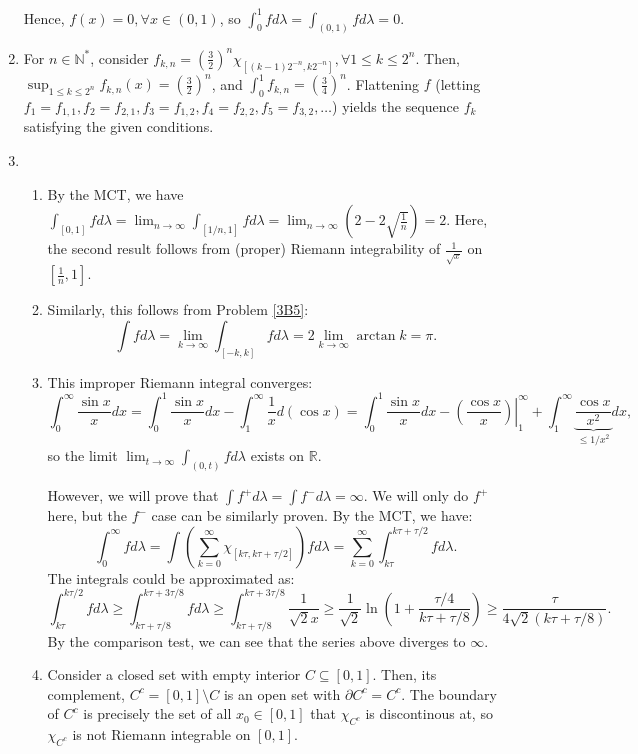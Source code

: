 \begin{enumerate}[label=\textbf{3B.\arabic*}]
  Hence, \( f(x) = 0, \forall  x \in (0, 1) \), so \( \int _{0}^{1} fd\lambda =
  \int _{(0, 1)} fd\lambda = 0 \). 
\item For \( n \in \mathbb{N}^{*} \), consider \( f_{k,n} = \left( \frac{3}{2}
  \right) ^{n} \chi_{[(k-1)2^{-n}, k 2^{-n}]}, \forall 1 \le k \le 2^{n} \).
  Then, \( \sup _{1 \le k \le 2^{n}} f_{k,n}(x) = \left( \frac{3}{2} \right)^{n}
  \), and \( \int _{0}^{1} f_{k,n} = \left( \frac{3}{4} \right) ^{n} \).
  Flattening \( f \) (letting \( f_{1} = f_{1,1}, f_{2} = f_{2,1}, f_{3} =
  f_{1,2}, f_{4} = f_{2,2}, f_{5} = f_{3,2}, \ldots  \)) yields the sequence \(
  f_{k}\) satisfying the given conditions.
\item \begin{enumerate}[label=(\alph*)]
    \item
  By the MCT, we have \( \int_{[0, 1]} fd\lambda = \lim_{n \to \infty} \int
  _{[1 /n, 1]} fd\lambda = \lim_{n \to \infty}\left( 2 - 2\sqrt{\frac{1}{n}}
  \right)  = 2  \). Here, the second result follows from (proper) Riemann
  integrability of \( \frac{1}{\sqrt{x} } \) on \(  \left[ \frac{1}{n}, 1
  \right]  \).
\item Similarly, this follows from Problem \ref{3B5}:
  \[
    \int fd\lambda = \lim_{ k \to \infty} \int _{[-k, k]}fd\lambda = 2 \lim_{ k
    \to \infty}  \arctan k = \pi
  .\]
\item This improper Riemann integral converges:
  \[
    \int _{0}^{\infty} \frac{\sin x}{x}dx = \int _{0}^{1} \frac{\sin x}{x}dx -\int
    _{1}^{\infty} \frac{1}{x} d(\cos x) = \int _{0}^{1} \frac{\sin x}{x}dx -
    \left.\left( \frac{\cos x}{x} \right)\right|_{1}^{\infty} + \int _{1}^{\infty}
    \underbrace{\frac{\cos x}{x^2}}_{\le 1 /x^2}dx
  ,\] so the limit \( \lim_{t \to \infty} \int _{(0, t)} fd\lambda \) exists on
  \( \mathbb{R} \).

  However, we will prove that \( \int f^{+}d\lambda = \int f^{-}d\lambda =
  \infty \). We will only do \( f^{+} \) here, but the \( f^{-} \) case can be
  similarly proven. By the MCT, we have:
  \[
    \int _{0}^{\infty} fd\lambda = \int \left( \sum_{k =
    0}^{\infty} \chi_{[k\tau, k\tau + \tau /2]} \right)  f d\lambda = \sum_{k =
  0}^{\infty} \int_{k\tau }^{k\tau  + \tau /2} fd\lambda
  .\] 
  The integrals could be approximated as:
  \[
    \int _{k\tau }^{k\tau /2} fd\lambda \ge 
    \int _{k\tau + \tau /8}^{k\tau +3\tau /8} fd\lambda 
    \ge 
    \int _{k\tau + \tau /8}^{k\tau +3\tau /8} \frac{1}{\sqrt{2} x} \ge
    \frac{1}{\sqrt{2} }\ln \left( 1 + \frac{\tau /4}{k\tau +\tau /8}\right)
    \ge \frac{\tau }{4\sqrt{2} (k\tau +\tau /8)}
  .\] 
  By the comparison test, we can see that the series above diverges to \( \infty
  \).
\item Consider a closed set with empty interior \( C \subseteq [0, 1] \). Then,
  its complement, \( C^{c} = [0, 1] \setminus C \) is an open set with \(
  \partial C^{c} = C^{c} \). The boundary of \( C^{c} \) is precisely the set of
  all \( x_{0} \in [0, 1] \) that \( \chi_{C^{c}} \) is discontinous at, so \(
  \chi_{C^{c}} \) is not Riemann integrable on \( [0, 1] \).
  

\end{enumerate}
\end{enumerate}
